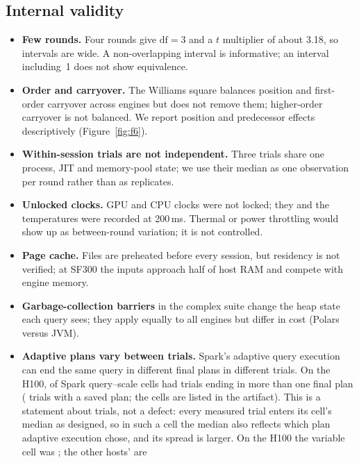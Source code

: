 \documentclass[11pt]{article}
\begin{document}
\subsection{Internal validity}
\begin{itemize}[leftmargin=*,itemsep=2pt]
  \item \textbf{Few rounds.} Four rounds give $\text{df}=3$ and a $t$
    multiplier of about 3.18, so intervals are wide. A non-overlapping
    interval is informative; an interval including~1 does not show
    equivalence.
  \item \textbf{Order and carryover.} The Williams square balances position
    and first-order carryover across engines but does not remove them;
    higher-order carryover is not balanced. We report position and predecessor
    effects descriptively (Figure~\ref{fig:f6}).
  \item \textbf{Within-session trials are not independent.} Three trials share
    one process, JIT and memory-pool state; we use their median as one
    observation per round rather than as replicates.
  \item \textbf{Unlocked clocks.} GPU and CPU clocks were not locked; they and
    the temperatures were recorded at 200\,ms. Thermal or power throttling would
    show up as between-round variation; it is not controlled.
  \item \textbf{Page cache.} Files are preheated before every session, but
    residency is not verified; at SF300 the inputs approach half of host RAM
    and compete with engine memory.
  \item \textbf{Garbage-collection barriers} in the complex suite change the
    heap state each query sees; they apply equally to all engines but differ
    in cost (Polars versus JVM).
  \item \textbf{Adaptive plans vary between trials.} Spark's adaptive query
    execution can end the same query in different final plans in different
    trials. On the H100,  of
     Spark query--scale cells had trials
    ending in more than one final plan (
    trials with a saved plan; the cells are listed in the artifact). This is a
    statement about trials, not a defect: every measured trial enters its
    cell's median as designed, so in such a cell the median also reflects which
    plan adaptive execution chose, and its spread is larger. On the H100 the
    variable cell was ; the other hosts' are

\end{itemize}
\end{document}
